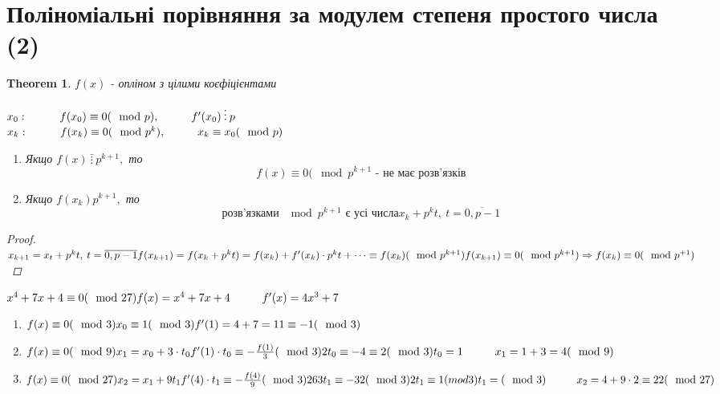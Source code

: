 \documentclass[a4paper,12pt]{bookest}
\newtheorem{theorem}{Theorem}[section]
\newcommand\tab[1][1cm]{\hspace*{#1}}
\begin{document}
\section{Поліноміальні порівняння за модулем степеня простого числа (2)}
\begin{theorem}
	$f(x)$ - опліном з цілими коєфіцієнтами 
	\begin{center}
		$x_0:\tab f(x_0)\equiv0(\mod p),\tab f'(x_0)\>\vdots\>p$\\$x_k:\tab f(x_k)\equiv0(\mod p^k),\tab x_k\equiv x_0(\mod p)$\\
		\begin{enumerate}
			\item Якщо $f(x)\>\bar{\vdots}\>p^{k+1},$ то $$f(x)\equiv0(\mod p^{k+1}\textrm{ - не має розв'язків}$$
			\item Якщо $f(x_k)p^{k+1},$ то 
			$$\textrm{розв'язками } \mod p^{k+1}\textrm{ є усі числа}x_k+p^kt,\>t=\overline{0,p-1}$$
		\end{enumerate}
	\end{center}
	\begin{proof}
		$\\x_{k+1}=x_t+p^kt,\>t=\overline{0,p-1}\\f(x_{k+1})=f(x_k+p^kt)=f(x_k)+f'(x_k)\cdot p^kt+\dots\equiv f(x_k)(\mod p^{k+1})\\f(x_{k+1})\equiv 0(\mod p^{k+1})\Rightarrow f(x_k)\equiv0(\mod p^{+1})$
	\end{proof}
\end{theorem}
\begin{example}
	$x^4+7x+4\equiv0(\mod 27)\\f(x)=x^4+7x+4\tab f'(x)=4x^3+7$\begin{enumerate}
		\item $f(x)\equiv0(\mod 3)\\x_0\equiv 1(\mod 3)\\f'(1)=4+7=11\equiv-1(\mod 3)$
		\item $f(x)\equiv0(\mod 9)\\x_1=x_0+3\cdot t_0\\f'(1)\cdot t_0\equiv-\frac{f(1)}{3}(\mod 3)\\2t_0\equiv-4\equiv 2(\mod 3)\\t_0=1\tab x_1=1+3=4(\mod 9)$
		\item $f(x)\equiv0(\mod 27)\\x_2=x_1+9t_1\\f'(4)\cdot t_1\equiv -\frac{f(4)}{9}(\mod 3)\\263t_1\equiv-32(\mod 3)\\2t_1\equiv 1(mod 3)\\t_1=(\mod 3)\tab x_2=4+9\cdot2\equiv 22(\mod 27)$
	\end{enumerate}
\end{example}
\end{document}
